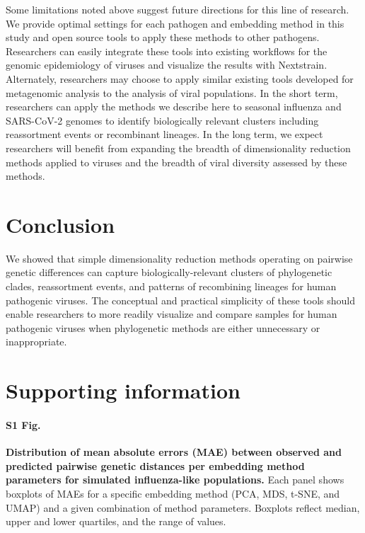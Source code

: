 \documentclass[10pt,letterpaper]{article}
\begin{document}
Some limitations noted above suggest future directions for this line of research.
We provide optimal settings for each pathogen and embedding method in this study and open source tools to apply these methods to other pathogens.
Researchers can easily integrate these tools into existing workflows for the genomic epidemiology of viruses and visualize the results with Nextstrain.
Alternately, researchers may choose to apply similar existing tools developed for metagenomic analysis \cite{Schloss2009,Schloss2020,Bolyen2019,McMurdie2013} to the analysis of viral populations.
In the short term, researchers can apply the methods we describe here to seasonal influenza and SARS-CoV-2 genomes to identify biologically relevant clusters including reassortment events or recombinant lineages.
In the long term, we expect researchers will benefit from expanding the breadth of dimensionality reduction methods applied to viruses and the breadth of viral diversity assessed by these methods.

\section*{Conclusion}

We showed that simple dimensionality reduction methods operating on pairwise genetic differences can capture biologically-relevant clusters of phylogenetic clades, reassortment events, and patterns of recombining lineages for human pathogenic viruses.
The conceptual and practical simplicity of these tools should enable researchers to more readily visualize and compare samples for human pathogenic viruses when phylogenetic methods are either unnecessary or inappropriate.

\section*{Supporting information}

\paragraph*{S1 Fig.}
\label{S1_Fig_simulated_flu_errors}
{\bf Distribution of mean absolute errors (MAE) between observed and predicted pairwise genetic distances per embedding method parameters for simulated influenza-like populations.} Each panel shows boxplots of MAEs for a specific embedding method (PCA, MDS, t-SNE, and UMAP) and a given combination of method parameters. Boxplots reflect median, upper and lower quartiles, and the range of values.
\end{document}
